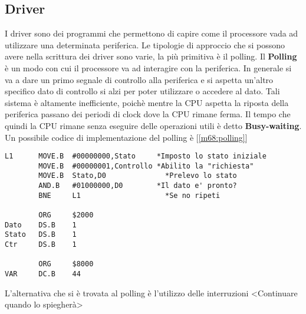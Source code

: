 \subsection{Driver}
I driver sono dei programmi che permettono di capire come il processore vada ad utilizzare una determinata periferica.
Le tipologie di approccio che si possono avere nella scrittura dei driver sono varie, la più primitiva è il polling.
Il \textbf{Polling} è un modo con cui il processore va ad interagire con la periferica. In generale si va a dare un primo segnale di controllo alla periferica e si aspetta un'altro specifico dato di controllo si alzi per poter utilizzare o accedere al dato. Tali sistema è altamente inefficiente, poichè mentre la CPU aspetta la riposta della periferica passano dei periodi di clock dove la CPU rimane ferma. Il tempo che quindi la CPU rimane senza eseguire delle operazioni utili è detto \textbf{Busy-waiting}. Un possibile codice di implementazione del polling è [\ref{m68:polling}]

\begin{lstlisting}[caption={Codice polling}, label=m68:polling]
L1      MOVE.B  #00000000,Stato     *Imposto lo stato iniziale
        MOVE.B  #00000001,Controllo *Abilito la "richiesta"
        MOVE.B  Stato,D0              *Prelevo lo stato
        AND.B   #01000000,D0        *Il dato e' pronto?
        BNE     L1                    *Se no ripeti
        
        ORG     $2000
Dato    DS.B    1
Stato   DS.B    1
Ctr     DS.B    1

        ORG     $8000
VAR     DC.B    44
\end{lstlisting}

L'alternativa che si è trovata al polling è l'utilizzo delle interruzioni <Continuare quando lo spiegherà>